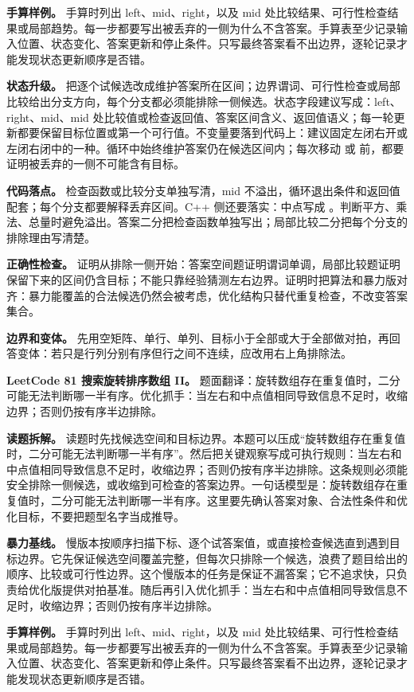 \textbf{手算样例。} 手算时列出 left、mid、right，以及 mid 处比较结果、可行性检查结果或局部趋势。每一步都要写出被丢弃的一侧为什么不含答案。手算表至少记录输入位置、状态变化、答案更新和停止条件。只写最终答案看不出边界，逐轮记录才能发现状态更新顺序是否错。

\textbf{状态升级。} 把逐个试候选改成维护答案所在区间；边界谓词、可行性检查或局部比较给出分支方向，每个分支都必须能排除一侧候选。状态字段建议写成：left、right、mid、mid 处比较值或检查返回值、答案区间含义、返回值语义；每一轮更新都要保留目标位置或第一个可行值。不变量要落到代码上：建议固定左闭右开或左闭右闭中的一种。循环中始终维护答案仍在候选区间内；每次移动  或  前，都要证明被丢弃的一侧不可能含有目标。

\textbf{代码落点。} 检查函数或比较分支单独写清，mid 不溢出，循环退出条件和返回值配套；每个分支都要解释丢弃区间。C++ 侧还要落实：中点写成 。判断平方、乘法、总量时避免溢出。答案二分把检查函数单独写出；局部比较二分把每个分支的排除理由写清楚。

\textbf{正确性检查。} 证明从排除一侧开始：答案空间题证明谓词单调，局部比较题证明保留下来的区间仍含目标；不能只靠经验猜测左右边界。证明时把算法和暴力版对齐：暴力能覆盖的合法候选仍然会被考虑，优化结构只替代重复检查，不改变答案集合。

\textbf{边界和变体。} 先用空矩阵、单行、单列、目标小于全部或大于全部做对拍，再回答变体：若只是行列分别有序但行之间不连续，应改用右上角排除法。

\noindent\textbf{LeetCode 81 搜索旋转排序数组 II。} 题面翻译：旋转数组存在重复值时，二分可能无法判断哪一半有序。优化抓手：当左右和中点值相同导致信息不足时，收缩边界；否则仍按有序半边排除。

\textbf{读题拆解。} 读题时先找候选空间和目标边界。本题可以压成“旋转数组存在重复值时，二分可能无法判断哪一半有序”。然后把关键观察写成可执行规则：当左右和中点值相同导致信息不足时，收缩边界；否则仍按有序半边排除。这条规则必须能安全排除一侧候选，或收缩到可检查的答案边界。一句话模型是：旋转数组存在重复值时，二分可能无法判断哪一半有序。这里要先确认答案对象、合法性条件和优化目标，不要把题型名字当成推导。

\textbf{暴力基线。} 慢版本按顺序扫描下标、逐个试答案值，或直接检查候选直到遇到目标边界。它先保证候选空间覆盖完整，但每次只排除一个候选，浪费了题目给出的顺序、比较或可行性边界。这个慢版本的任务是保证不漏答案；它不追求快，只负责给优化版提供对拍基准。随后再引入优化抓手：当左右和中点值相同导致信息不足时，收缩边界；否则仍按有序半边排除。

\textbf{手算样例。} 手算时列出 left、mid、right，以及 mid 处比较结果、可行性检查结果或局部趋势。每一步都要写出被丢弃的一侧为什么不含答案。手算表至少记录输入位置、状态变化、答案更新和停止条件。只写最终答案看不出边界，逐轮记录才能发现状态更新顺序是否错。

